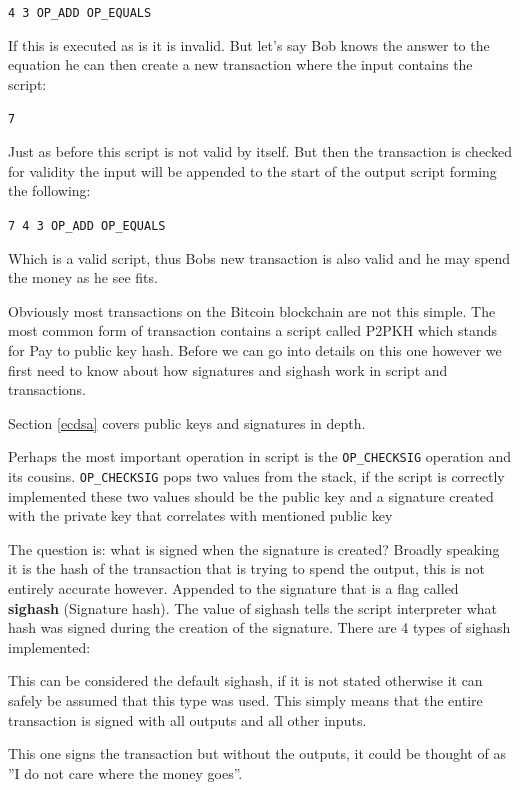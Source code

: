 \texttt{4 3 OP\_ADD OP\_EQUALS}

If this is executed as is it is invalid. But let's say Bob knows the answer to the equation he can then create a new transaction where the input contains the script: 

\texttt{7} 

Just as before this script is not valid by itself. But then the transaction is checked for validity the input will be appended to the start of the output script forming the following: 

\texttt{7 4 3 OP\_ADD OP\_EQUALS}

Which is a valid script, thus Bobs new transaction is also valid and he may spend the money as he see fits. 

Obviously most transactions on the Bitcoin blockchain are not this simple. The most common form of transaction contains a script called P2PKH which stands for Pay to public key hash. Before we can go into details on this one however we first need to know about how signatures and sighash work in script and transactions.

Section \ref{ecdsa} covers public keys and signatures in depth.

Perhaps the most important operation in script is the \texttt{OP\_CHECKSIG} operation and its cousins. \texttt{OP\_CHECKSIG} pops two values from the stack, if the script is correctly implemented these two values should be the public key and a signature created with the private key that correlates with mentioned public key

The question is: what is signed when the signature is created? Broadly speaking it is the hash of the transaction that is trying to spend the output, this is not entirely accurate however.\cite{antonopoulos_2017} Appended to the signature that is a flag called \textbf{sighash} (Signature hash). The value of sighash tells the script interpreter what hash was signed during the creation of the signature.\cite{bitcoin_core_sighash} There are 4 types of sighash implemented:

This can be considered the default sighash, if it is not stated otherwise it can safely be assumed that this type was used. This simply means that the entire transaction is signed with all outputs and all other inputs.

This one signs the transaction but without the outputs, it could be thought of as ''I do not care where the money goes''.

